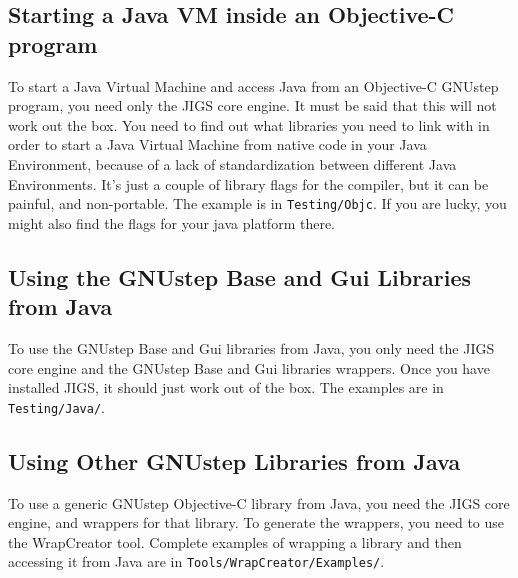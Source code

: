 \subsection{Starting a Java VM inside an Objective-C program}
To start a Java Virtual Machine and access Java from an Objective-C
GNUstep program, you need only the JIGS core engine.  It must be said
that this will not work out the box.  You need to find out what
libraries you need to link with in order to start a Java Virtual
Machine from native code in your Java Environment, because of a lack
of standardization between different Java Environments.  It's just a
couple of library flags for the compiler, but it can be painful, and
non-portable.  The example is in \texttt{Testing/Objc}.  If you are
lucky, you might also find the flags for your java platform there.

\subsection{Using the GNUstep Base and Gui Libraries from Java}
To use the GNUstep Base and Gui libraries from Java, you only need the
JIGS core engine and the GNUstep Base and Gui libraries wrappers.
Once you have installed JIGS, it should just work out of the box.  The
examples are in \texttt{Testing/Java/}.

\subsection{Using Other GNUstep Libraries from Java}
To use a generic GNUstep Objective-C library from Java, you need the
JIGS core engine, and wrappers for that library.  To generate the
wrappers, you need to use the WrapCreator tool.  Complete examples of
wrapping a library and then accessing it from Java are in
\texttt{Tools/WrapCreator/Examples/}.


